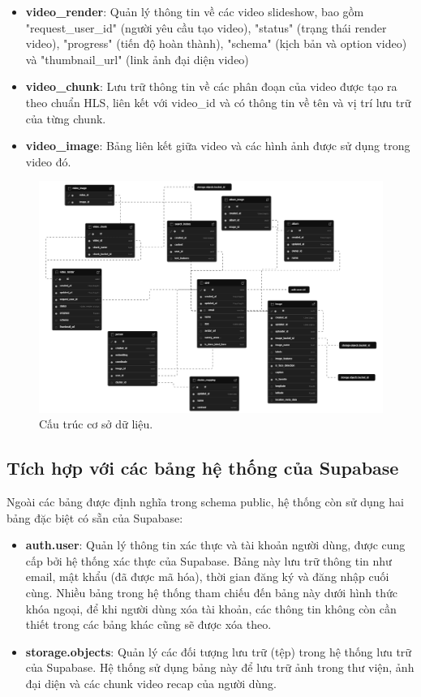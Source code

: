 \begin{itemize}
    \item \textbf{video\_render}: Quản lý thông tin về các video slideshow, bao gồm "request\_user\_id" (người yêu cầu tạo video), "status" (trạng thái render video), "progress" (tiến độ hoàn thành), "schema" (kịch bản và option video) và "thumbnail\_url" (link ảnh đại diện video)
    
    \item \textbf{video\_chunk}: Lưu trữ thông tin về các phân đoạn của video được tạo ra theo chuẩn HLS, liên kết với video\_id và có thông tin về tên và vị trí lưu trữ của từng chunk.
    
    \item \textbf{video\_image}: Bảng liên kết giữa video và các hình ảnh được sử dụng trong video đó.
\end{itemize}

\begin{figure}[H]
    \centering  
    \includegraphics[width=1\textwidth]{figures/c3/3-4-database-graph.png}
    \caption{Cấu trúc cơ sở dữ liệu.}
    \label{fig:3-4-database-diagram}
\end{figure}

\subsection{Tích hợp với các bảng hệ thống của Supabase}

Ngoài các bảng được định nghĩa trong schema public, hệ thống còn sử dụng hai bảng đặc biệt có sẵn của Supabase:

\begin{itemize}
    \item \textbf{auth.user}: Quản lý thông tin xác thực và tài khoản người dùng, được cung cấp bởi hệ thống xác thực của Supabase. Bảng này lưu trữ thông tin như email, mật khẩu (đã được mã hóa), thời gian đăng ký và đăng nhập cuối cùng. Nhiều bảng trong hệ thống tham chiếu đến bảng này dưới hình thức khóa ngoại, để khi người dùng xóa tài khoản, các thông tin không còn cần thiết trong các bảng khác cũng sẽ được xóa theo.
    
    \item \textbf{storage.objects}: Quản lý các đối tượng lưu trữ (tệp) trong hệ thống lưu trữ của Supabase. Hệ thống sử dụng bảng này để lưu trữ ảnh trong thư viện, ảnh đại diện và các chunk video recap của người dùng.
\end{itemize}

